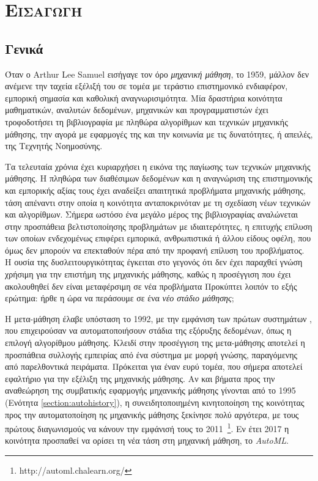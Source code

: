 \chapter{\scshape{Εισαγωγή}}
\section{Γενικά}
Όταν ο Arthur Lee Samuel εισήγαγε τον όρο \textit{μηχανική μάθηση}, το 1959, μάλλον δεν ανέμενε την ταχεία εξέλιξή του σε τομέα με τεράστιο επιστημονικό ενδιαφέρον, εμπορική σημασία και καθολική αναγνωρισιμότητα. Μία δραστήρια κοινότητα μαθηματικών, αναλυτών δεδομένων, μηχανικών και προγραμματιστών έχει τροφοδοτήσει τη βιβλιογραφία με πληθώρα αλγορίθμων και τεχνικών μηχανικής μάθησης, την αγορά με εφαρμογές της και την κοινωνία με τις δυνατότητες, ή απειλές, της Τεχνητής Νοημοσύνης.

Τα τελευταία χρόνια έχει κυριαρχήσει η εικόνα της παγίωσης των τεχνικών μηχανικής μάθησης. Η πληθώρα των διαθέσιμων δεδομένων και η αναγνώριση της επιστημονικής και εμπορικής αξίας τους έχει αναδείξει απαιτητικά προβλήματα μηχανικής μάθησης, τάση απέναντι στην οποία η κοινότητα ανταποκρινόταν με τη σχεδίαση νέων τεχνικών και αλγορίθμων. Σήμερα ωστόσο ένα μεγάλο μέρος της βιβλιογραφίας αναλώνεται στην προσπάθεια βελτιστοποίησης προβλημάτων με ιδιαιτερότητες, η επιτυχής επίλυση των οποίων ενδεχομένως επιφέρει εμπορικά, ανθρωπιστικά ή άλλου είδους οφέλη, που όμως δεν μπορούν να επεκταθούν πέρα από την προφανή επίλυση του προβλήματος. Η ουσία της δυσλειτουργικότητας έγκειται στο γεγονός ότι δεν έχει παραχθεί γνώση χρήσιμη για την επιστήμη της μηχανικής μάθησης, καθώς η προσέγγιση που έχει ακολουθηθεί δεν είναι μεταφέρσιμη σε νέα προβλήματα Προκύπτει λοιπόν το εξής ερώτημα: ήρθε η ώρα να περάσουμε σε ένα \textit{νέο στάδιο μάθησης};

Η μετα-μάθηση έλαβε υπόσταση το 1992, με την εμφάνιση των πρώτων συστημάτων \citep{craw1993,Brazdil1994}, που επιχειρούσαν να αυτοματοποιήσουν στάδια της εξόρυξης δεδομένων, όπως η επιλογή αλγορίθμου μάθησης. Κλειδί στην προσέγγιση της μετα-μάθησης αποτελεί η προσπάθεια συλλογής εμπειρίας από ένα σύστημα με μορφή γνώσης, παραγόμενης από παρελθοντικά πειράματα. Πρόκειται για έναν ευρύ τομέα, που σήμερα αποτελεί εφαλτήριο για την εξέλιξη της μηχανικής μάθησης. Αν και βήματα προς την αναθεώρηση της συμβατικής εφαρμογής μηχανικής μάθησης γίνονται από το 1995 (Ενότητα \ref{section:autohistory}), η συνειδητοποιημένη κινητοποίηση της κοινότητας προς την αυτοματοποίηση ης μηχανικής μάθησης ξεκίνησε πολύ αργότερα, με τους πρώτους διαγωνισμούς να κάνουν την εμφάνισή τους το 2011~\footnote{http://automl.chalearn.org/}. Εν έτει 2017 η κοινότητα προσπαθεί να ορίσει τη νέα τάση στη μηχανική μάθηση, το \textit{AutoML}.

